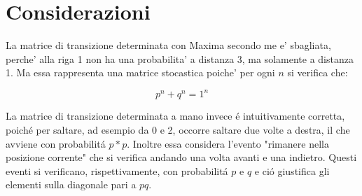 \documentclass{article}
\begin{document}
\section{Considerazioni}

La matrice di transizione determinata con Maxima secondo me e' sbagliata, perche' alla riga 1 non ha una probabilita' a distanza 3, ma solamente a distanza 1. Ma essa rappresenta una matrice stocastica poiche' per ogni $n$ si verifica che: 

$$ p^n + q^n = 1^n $$

La matrice di transizione determinata a mano invece \'{e} intuitivamente corretta, poich\'{e} per saltare, ad esempio da 0 e 2, occorre saltare due volte a destra, il che avviene con probabilit\'{a} $p*p$. Inoltre essa considera l'evento "rimanere nella posizione corrente" che si verifica andando una volta avanti e una indietro. Questi eventi si verificano, rispettivamente, con probabilit\'{a} $p$ e $q$ e ci\'{o} giustifica gli elementi sulla diagonale pari a $pq$.
\end{document}
